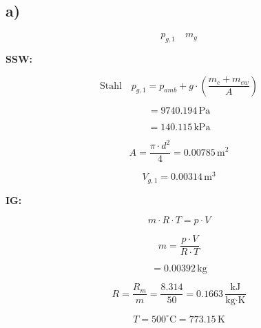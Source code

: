 

\subsection*{a)}

\[
p_{g,1} \quad m_{g}
\]

\textbf{SSW:}

\[
\text{Stahl} \quad p_{g,1} = p_{amb} + g \cdot \left( \frac{m_c + m_{ew}}{A} \right)
\]

\[
= 9740.194 \, \text{Pa}
\]

\[
= 140.115 \, \text{kPa}
\]

\[
A = \frac{\pi \cdot d^2}{4} = 0.00785 \, \text{m}^2
\]

\[
V_{g,1} = 0.00314 \, \text{m}^3
\]

\textbf{IG:}

\[
m \cdot R \cdot T = p \cdot V
\]

\[
m = \frac{p \cdot V}{R \cdot T}
\]

\[
= 0.00392 \, \text{kg}
\]

\[
R = \frac{R_m}{m} = \frac{8.314}{50} = 0.1663 \, \frac{\text{kJ}}{\text{kg} \cdot \text{K}}
\]

\[
T = 500^\circ \text{C} = 773.15 \, \text{K}
\]